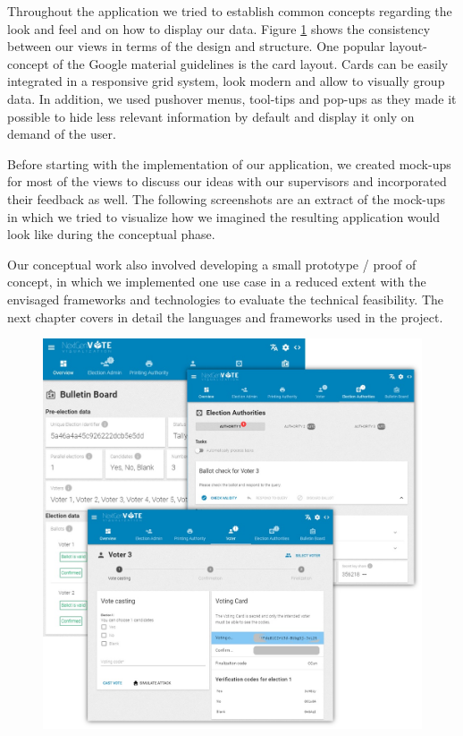 Throughout the application we tried to establish common concepts regarding the look and feel and on how to display our data. Figure \ref{finalProduct} shows the consistency between our views in terms of the design and structure. One popular layout-concept of the Google material guidelines is the card layout. Cards can be easily integrated in a responsive grid system, look modern and allow to visually group data. In addition, we used pushover menus, tool-tips and pop-ups as they made it possible to hide less relevant information by default and display it only on demand of the user.

Before starting with the implementation of our application, we created mock-ups for most of the views to discuss our ideas with our supervisors and incorporated their feedback as well. The following screenshots are an extract of the mock-ups in which we tried to visualize how we imagined the resulting application would look like during the conceptual phase.


Our conceptual work also involved developing a small prototype / proof of concept, in which we implemented one use case in a reduced extent with the envisaged frameworks and technologies to evaluate the technical feasibility. The next chapter covers in detail the languages and frameworks used in the project.

\begin{figure}
\begin{center}
\includegraphics[scale=0.65]{assets/combined.png}
\label{finalProduct}%
\end{center}
\end{figure}

